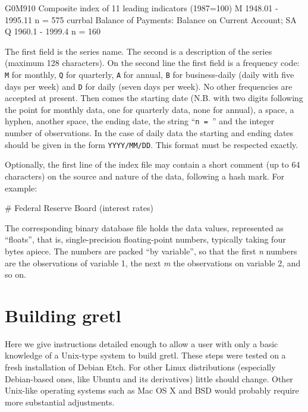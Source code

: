 \begin{code}
G0M910  Composite index of 11 leading indicators (1987=100) 
M 1948.01 - 1995.11  n = 575
currbal Balance of Payments: Balance on Current Account; SA 
Q 1960.1 - 1999.4 n = 160
\end{code}

The first field is the series name.  The second is a description of
the series (maximum 128 characters).  On the second line the first
field is a frequency code: \verb+M+ for monthly, \verb+Q+ for
quarterly, \verb+A+ for annual, \verb+B+ for business-daily (daily
with five days per week) and \verb+D+ for daily (seven days per week).
No other frequencies are accepted at present.  Then comes the starting
date (N.B. with two digits following the point for monthly data, one
for quarterly data, none for annual), a space, a hyphen, another
space, the ending date, the string ``\verb+n = +'' and the integer
number of observations. In the case of daily data the starting and
ending dates should be given in the form \verb+YYYY/MM/DD+. This
format must be respected exactly.

Optionally, the first line of the index file may contain a short
comment (up to 64 characters) on the source and nature of the data,
following a hash mark.  For example:

\begin{code}
# Federal Reserve Board (interest rates)
\end{code}

The corresponding binary database file holds the data values,
represented as ``floats'', that is, single-precision floating-point
numbers, typically taking four bytes apiece.  The numbers are packed
``by variable'', so that the first \emph{n} numbers are the
observations of variable 1, the next \emph{m} the observations on
variable 2, and so on.



\chapter{Building gretl}
\label{app-build}

Here we give instructions detailed enough to allow a user
with only a basic knowledge of a Unix-type system to build gretl.
These steps were tested on a fresh installation of Debian Etch. For
other Linux distributions (especially Debian-based ones, like Ubuntu
and its derivatives) little should change. Other Unix-like operating
systems such as Mac OS X and BSD would probably require more substantial
adjustments.

